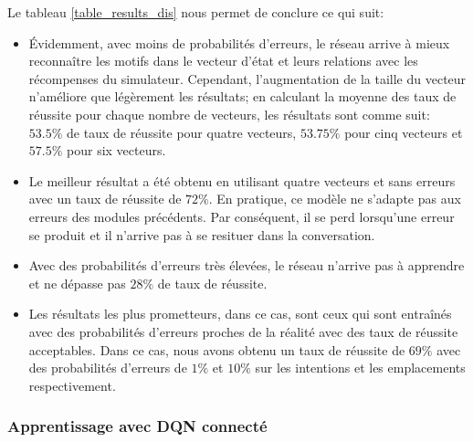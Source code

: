 Le tableau \ref{table_results_dis} nous permet de conclure ce qui suit:
\begin{itemize}
	\item Évidemment, avec moins de probabilités d'erreurs, le réseau arrive à mieux reconnaître les motifs dans le vecteur d'état et leurs relations avec les récompenses du simulateur. Cependant, l'augmentation de la taille du vecteur n'améliore que légèrement les résultats; en calculant la moyenne des taux de réussite pour chaque nombre de vecteurs, les résultats sont comme suit: $53.5\%$ de taux de réussite pour quatre vecteurs, $53.75\%$ pour cinq vecteurs et $57.5\%$ pour six vecteurs.
	\item Le meilleur résultat a été obtenu en utilisant quatre vecteurs et sans erreurs avec un taux de réussite de $72\%$. En pratique, ce modèle ne s'adapte pas aux erreurs des modules précédents. Par conséquent, il se perd lorsqu'une erreur se produit et il n'arrive pas à se resituer dans la conversation.
	\item Avec des probabilités d'erreurs très élevées, le réseau n'arrive pas à apprendre et ne dépasse pas $28\%$ de taux de réussite.
	\item Les résultats les plus prometteurs, dans ce cas, sont ceux qui sont entraînés avec des probabilités d'erreurs proches de la réalité avec des taux de réussite acceptables. Dans ce cas, nous avons obtenu un taux de réussite de $69\%$ avec des probabilités d'erreurs de $1\%$ et $10\%$ sur les intentions et les emplacements respectivement.
\end{itemize}

\subsubsection{Apprentissage avec DQN connecté}
